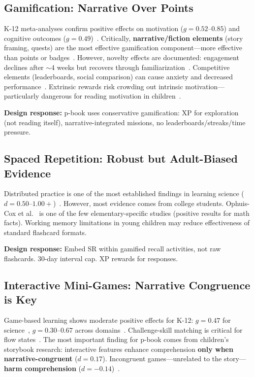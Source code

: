 \documentclass[11pt,a4paper]{article}
\begin{document}
\subsection{Gamification: Narrative Over Points}

K-12 meta-analyses confirm positive effects on motivation ($g{=}0.52$--$0.85$) and cognitive outcomes ($g{=}0.49$)~\cite{sailer2019,kurnaz2025,dehghanzadeh2023}. Critically, \textbf{narrative/fiction elements} (story framing, quests) are the most effective gamification component---more effective than points or badges~\cite{sailer2019}. However, novelty effects are documented: engagement declines after $\sim$4 weeks but recovers through familiarization~\cite{rodrigues2022}. Competitive elements (leaderboards, social comparison) can cause anxiety and decreased performance~\cite{almeida2022}. Extrinsic rewards risk crowding out intrinsic motivation---particularly dangerous for reading motivation in children~\cite{gneezy2011}.

\textbf{Design response:} p-book uses conservative gamification: XP for exploration (not reading itself), narrative-integrated missions, no leaderboards/streaks/time pressure.

\subsection{Spaced Repetition: Robust but Adult-Biased Evidence}

Distributed practice is one of the most established findings in learning science ($d{=}0.50$--$1.00{+}$)~\cite{cepeda2006,weinstein2018,mcdermott2020}. However, most evidence comes from college students. Ophuis-Cox et al.~\cite{ophuiscox2023} is one of the few elementary-specific studies (positive results for math facts). Working memory limitations in young children may reduce effectiveness of standard flashcard formats.

\textbf{Design response:} Embed SR within gamified recall activities, not raw flashcards. 30-day interval cap. XP rewards for responses.

\subsection{Interactive Mini-Games: Narrative Congruence is Key}

Game-based learning shows moderate positive effects for K-12: $g{=}0.47$ for science~\cite{tsai2020}, $g{=}0.30$--$0.67$ across domains~\cite{yu2019}. Challenge-skill matching is critical for flow states~\cite{hamari2015}. The most important finding for p-book comes from children's storybook research: interactive features enhance comprehension \textbf{only when narrative-congruent} ($d{=}0.17$). Incongruent games---unrelated to the story---\textbf{harm comprehension} ($d{=}-0.14$)~\cite{takacs2015,bus2014}.
\end{document}
